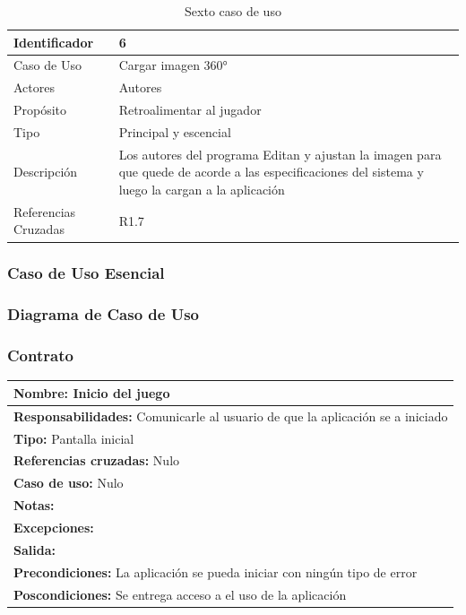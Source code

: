 \begin{table}[H]
    \begin{center}
        \begin{tabular}{| l | m{12cm} |}        
        	\hline 
        	Identificador & 6\\
        	\hline
        	Caso de Uso & Cargar imagen 360°\\
        	\hline
        	Actores & Autores\\
        	\hline
        	Propósito & Retroalimentar al jugador\\
        	\hline
        	Tipo & Principal y escencial\\
        	\hline
        	Descripción & Los autores del programa Editan y ajustan la imagen para que quede de acorde a las especificaciones del sistema y luego la cargan a la aplicación\\
        	\hline
        	Referencias Cruzadas & R1.7\\
        	\hline
        \end{tabular}
    \caption{Sexto caso de uso}
    \end{center}
\end{table}
\subsubsection{Caso de Uso Esencial}

\subsubsection{Diagrama de Caso de Uso}
\subsubsection{Contrato}
\begin{table}[H]
    \begin{center}
        \begin{tabular}{| m{15cm} |}       
        	\hline 
        	\textbf{Nombre:} Inicio del juego \\
        	\hline
        	\textbf{Responsabilidades:} Comunicarle al usuario de que la aplicación se a iniciado\\
        	\hline
        	\textbf{Tipo:} Pantalla inicial \\
        	\hline
        	\textbf{Referencias cruzadas:} Nulo\\
        	\hline
        	\textbf{Caso de uso:} Nulo\\
        	\hline
        	\textbf{Notas:} \\
        	\hline
        	\textbf{Excepciones:} \\
        	\hline
        	\textbf{Salida:} \\
        	\hline
        	\textbf{Precondiciones:} La aplicación se pueda iniciar con ningún tipo de error\\
        	\hline
        	\textbf{Poscondiciones:} Se entrega acceso a el uso de la aplicación\\
        	\hline
        \end{tabular}
    \end{center}
\end{table}

